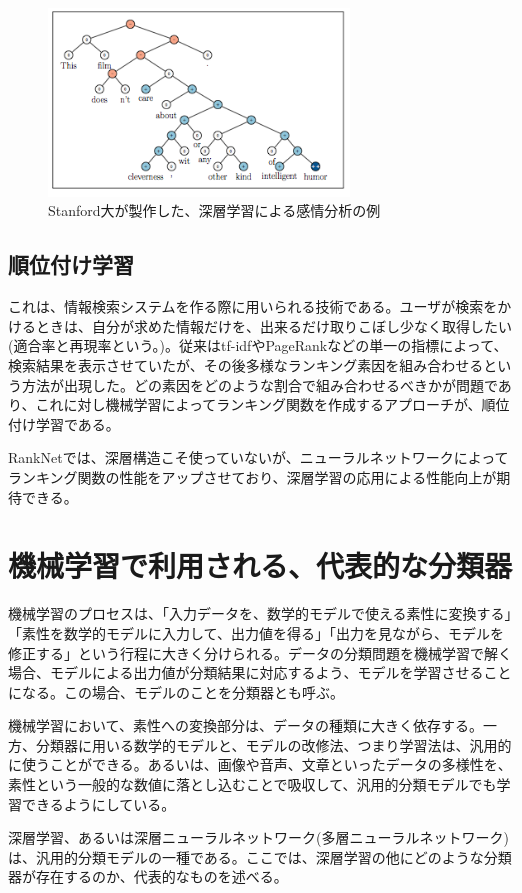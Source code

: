\begin{figure}[tbp]
 \centering
  \includegraphics[width=80mm]{img/c2/rntn_ex}
 \caption{Stanford大が製作した、深層学習による感情分析の例}
 \label{c2_rntn_ex}
\end{figure}

\subsection{順位付け学習}
これは、情報検索システムを作る際に用いられる技術である。ユーザが検索をかけるときは、自分が求めた情報だけを、出来るだけ取りこぼし少なく取得したい(適合率と再現率という。\cite{jianshen1999qingbaojiansuotoyanyuchuli})。従来はtf-idfやPageRank\cite{brin1998the-anatomy}\cite{page1999the-pagerank}などの単一の指標によって、検索結果を表示させていたが、その後多様なランキング素因を組み合わせるという方法が出現した。どの素因をどのような割合で組み合わせるべきかが問題であり、これに対し機械学習によってランキング関数を作成するアプローチが、順位付け学習である。\par
RankNet\cite{burges2005learning}では、深層構造こそ使っていないが、ニューラルネットワークによってランキング関数の性能をアップさせており、深層学習の応用による性能向上が期待できる。

\section{機械学習で利用される、代表的な分類器}
機械学習のプロセスは、「入力データを、数学的モデルで使える素性に変換する」「素性を数学的モデルに入力して、出力値を得る」「出力を見ながら、モデルを修正する」という行程に大きく分けられる。データの分類問題を機械学習で解く場合、モデルによる出力値が分類結果に対応するよう、モデルを学習させることになる。この場合、モデルのことを分類器とも呼ぶ。\par
機械学習において、素性への変換部分は、データの種類に大きく依存する。一方、分類器に用いる数学的モデルと、モデルの改修法、つまり学習法は、汎用的に使うことができる。あるいは、画像や音声、文章といったデータの多様性を、素性という一般的な数値に落とし込むことで吸収して、汎用的分類モデルでも学習できるようにしている。\par
深層学習、あるいは深層ニューラルネットワーク(多層ニューラルネットワーク)は、汎用的分類モデルの一種である。ここでは、深層学習の他にどのような分類器が存在するのか、代表的なものを述べる。

